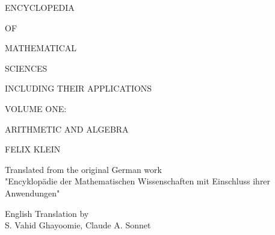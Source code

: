 \documentclass{book}
\begin{document}

\begin{center}
\vspace*{1cm}
{\fontsize{36}{42}\selectfont ENCYCLOPEDIA}

\vspace{0.5cm}
{\fontsize{24}{30}\selectfont OF}

\vspace{0.5cm}
{\fontsize{36}{42}\selectfont MATHEMATICAL}

\vspace{0.5cm}
{\fontsize{36}{42}\selectfont SCIENCES}

\vspace{1cm}
{\fontsize{18}{22}\selectfont INCLUDING THEIR APPLICATIONS}

\vspace{2cm}
{\fontsize{20}{26}\selectfont VOLUME ONE:}

\vspace{0.5cm}
{\fontsize{24}{30}\selectfont ARITHMETIC AND ALGEBRA}

\vspace{1.0cm}
{\fontsize{18}{22}\selectfont FELIX KLEIN}

\vspace{0.8cm}
{\fontsize{14}{16}\selectfont Translated from the original German work\\
"Encyklopädie der Mathematischen Wissenschaften mit Einschluss ihrer Anwendungen"}

\vspace{0.8cm}
{\fontsize{14}{20}\selectfont English Translation by\\[0.3cm]
S. Vahid Ghayoomie, Claude A. Sonnet}

\vspace{0.5cm}
{\fontsize{12}{20}}

\end{center}




\cleardoublepage



\setcounter{page}{6}
\pagestyle{fancy}
\fancyhf{}
\fancyhead[LE]{\thepage}
\fancyhead[RO]{\thepage}
\renewcommand{\headrulewidth}{0pt}






% 
% 
% 
% 
% 
% 
% 
% 
% 
% 

\cleardoublepage
{}

\end{document}
